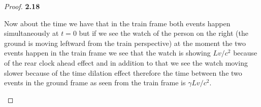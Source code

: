 \documentclass[11pt]{article}
\theoremstyle{definition}
\begin{document}
\begin{proof}{\textbf{2.18}}
\begin{itemize}
            Now about the time we have that in the train frame both events happen
            simultaneously at $t=0$ but if we see the watch of the person on the right
            (the ground is moving leftward from the train perspective)
            at the moment the two events happen in the train frame we see that the watch
            is showing $Lv/c^2$ because of the rear clock ahead effect and in addition
            to that we see the watch moving slower because of the time dilation effect
            therefore the time between the two events in the ground frame as seen
            from the train frame is $\gamma Lv/c^2$.
        \end{itemize}
    \end{proof}
\end{document}
